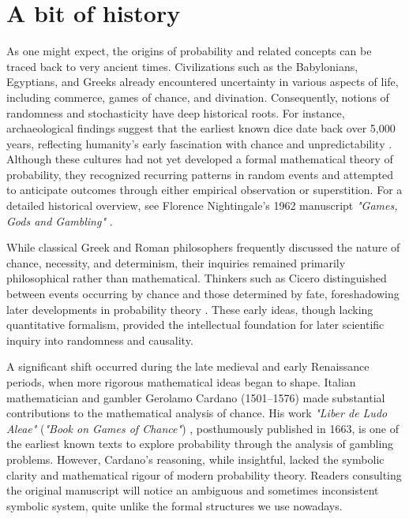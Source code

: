 \documentclass{book}
\begin{document}
\newpage

\section*{A bit of history}

As one might expect, the origins of probability and related concepts can be traced back to very ancient times. Civilizations such as the Babylonians, Egyptians, and Greeks already encountered uncertainty in various aspects of life, including commerce, games of chance, and divination. Consequently, notions of randomness and stochasticity have deep historical roots. For instance, archaeological findings suggest that the earliest known dice date back over 5,000 years, reflecting humanity’s early fascination with chance and unpredictability \cite{finkel2007ancient}. Although these cultures had not yet developed a formal mathematical theory of probability, they recognized recurring patterns in random events and attempted to anticipate outcomes through either empirical observation or superstition. For a detailed historical overview, see Florence Nightingale's 1962 manuscript \textit{"Games, Gods and Gambling"} \cite{david1962games}.

\medskip

While classical Greek and Roman philosophers frequently discussed the nature of chance, necessity, and determinism, their inquiries remained primarily philosophical rather than mathematical. Thinkers such as Cicero distinguished between events occurring by chance and those determined by fate, foreshadowing later developments in probability theory \cite{cicero45bce}. These early ideas, though lacking quantitative formalism, provided the intellectual foundation for later scientific inquiry into randomness and causality.

A significant shift occurred during the late medieval and early Renaissance periods, when more rigorous mathematical ideas began to shape. Italian mathematician and gambler Gerolamo Cardano (1501–1576) made substantial contributions to the mathematical analysis of chance. His work \textit{"Liber de Ludo Aleae"} (\textit{"Book on Games of Chance"}) \cite{cardano1663ludo}, posthumously published in 1663, is one of the earliest known texts to explore probability through the analysis of gambling problems. However, Cardano’s reasoning, while insightful, lacked the symbolic clarity and mathematical rigour of modern probability theory. Readers consulting the original manuscript will notice an ambiguous and sometimes inconsistent symbolic system, quite unlike the formal structures we use nowadays.
\end{document}
